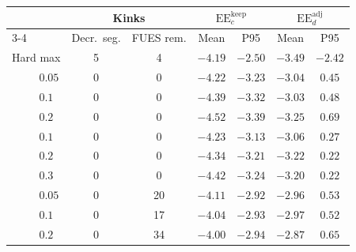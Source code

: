 \begin{tabular}{llcccccc}
\hline
 &  & \multicolumn{2}{c}{Kinks} & \multicolumn{2}{c}{$\mathrm{EE}_c^{\mathrm{keep}}$} & \multicolumn{2}{c}{$\mathrm{EE}_d^{\mathrm{adj}}$} \\
\cline{3-4}\cline{5-6}\cline{7-8}
 &  & Decr.\ seg. & FUES rem. & Mean & P95 & Mean & P95 \\
\hline
\multicolumn{2}{l}{Hard max} & 5 & 4 & $-4.19$ & $-2.50$ & $-3.49$ & $-2.42$ \\
\addlinespace
\multirow{3}{*}{$\sigma_\zeta$} & $0.05$ & 0 & 0 & $-4.22$ & $-3.23$ & $-3.04$ & $0.45$ \\
 & $0.1$ & 0 & 0 & $-4.39$ & $-3.32$ & $-3.03$ & $0.48$ \\
 & $0.2$ & 0 & 0 & $-4.52$ & $-3.39$ & $-3.25$ & $0.69$ \\
\addlinespace
\multirow{3}{*}{$S$} & $0.1$ & 0 & 0 & $-4.23$ & $-3.13$ & $-3.06$ & $0.27$ \\
 & $0.2$ & 0 & 0 & $-4.34$ & $-3.21$ & $-3.22$ & $0.22$ \\
 & $0.3$ & 0 & 0 & $-4.42$ & $-3.24$ & $-3.20$ & $0.22$ \\
\addlinespace
\multirow{3}{*}{$\sigma_p$} & $0.05$ & 0 & 20 & $-4.11$ & $-2.92$ & $-2.96$ & $0.53$ \\
 & $0.1$ & 0 & 17 & $-4.04$ & $-2.93$ & $-2.97$ & $0.52$ \\
 & $0.2$ & 0 & 34 & $-4.00$ & $-2.94$ & $-2.87$ & $0.65$ \\
\hline
\end{tabular}
